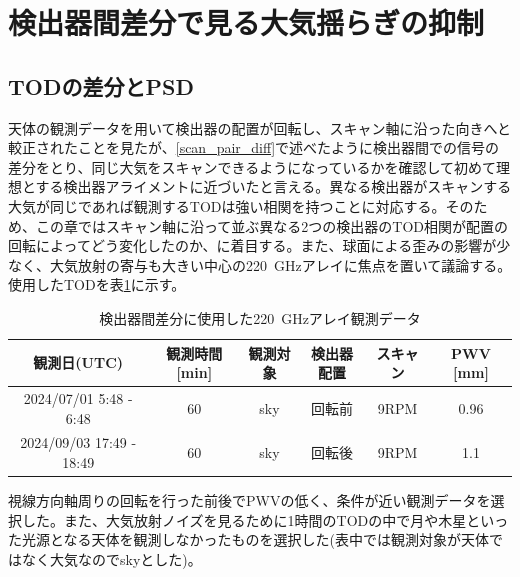 \section{検出器間差分で見る大気揺らぎの抑制}

\subsection{TODの差分とPSD}
天体の観測データを用いて検出器の配置が回転し、スキャン軸に沿った向きへと較正されたことを見たが、\ref{scan_pair_diff}で述べたように検出器間での信号の差分をとり、同じ大気をスキャンできるようになっているかを確認して初めて理想とする検出器アライメントに近づいたと言える。異なる検出器がスキャンする大気が同じであれば観測するTODは強い相関を持つことに対応する。そのため、この章ではスキャン軸に沿って並ぶ異なる2つの検出器のTOD相関が配置の回転によってどう変化したのか、に着目する。また、球面による歪みの影響が少なく、大気放射の寄与も大きい中心の\SI{220}{GHz}アレイに焦点を置いて議論する。使用したTODを表\ref{pair_diff_table}に示す。
\begin{table}[htbp]
  \centering
  \caption{検出器間差分に使用した\SI{220}{GHz}アレイ観測データ}
  \vspace{3mm}
  \begin{tabular}{cccccc} \hline
    観測日(UTC) & 観測時間 [min] & 観測対象 & 検出器配置 & スキャン & PWV [mm]\\ \hline
    2024/07/01 5:48 - 6:48 & 60 & sky & 回転前 & 9RPM & 0.96\\ \hline
    2024/09/03 17:49 - 18:49 & 60 & sky & 回転後 & 9RPM & 1.1 \\ \hline

  \end{tabular}
  \label{pair_diff_table}
\end{table}
視線方向軸周りの回転を行った前後でPWVの低く、条件が近い観測データを選択した。また、大気放射ノイズを見るために1時間のTODの中で月や木星といった光源となる天体を観測しなかったものを選択した(表中では観測対象が天体ではなく大気なのでskyとした)。


